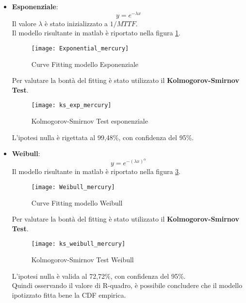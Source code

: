 \begin{itemize}
  \item \textbf{Esponenziale}:
  $$ y = e^{- \lambda  x} $$
  Il valore $\lambda$ è stato inizializzato a $1/MTTF$.\\
  Il modello risultante in matlab è riportato nella figura \ref{Exponential_mercury}.\\

  \begin{figure}[!htbp]
    \centering
    \texttt{[image: Exponential\_mercury]}
    \caption{Curve Fitting modello Esponenziale}
    \label{Exponential_mercury}
  \end{figure}

  Per valutare la bontà del fitting è stato utilizzato il \textbf{Kolmogorov-Smirnov Test}.\\

  \begin{figure}[!htbp]
    \centering
    \texttt{[image: ks\_exp\_mercury]}
    \caption{Kolmogorov-Smirnov Test esponenziale}
    \label{ks_exp_mercury}
  \end{figure}

  L'ipotesi nulla è rigettata al 99,48\%, con confidenza del 95\%.

  \clearpage

  \item \textbf{Weibull}:
  $$ y = e^{- (\lambda x)^\alpha} $$
  Il modello risultante in matlab è riportato nella figura \ref{Weibull_mercury}.\\
  \begin{figure}[!htbp]
    \texttt{[image: Weibull\_mercury]}
    \caption{Curve Fitting modello Weibull}
    \label{Weibull_mercury}
  \end{figure}

  Per valutare la bontà del fitting è stato utilizzato il \textbf{Kolmogorov-Smirnov Test}.\\

  \begin{figure}[!htbp]
    \centering
    \texttt{[image: ks\_weibull\_mercury]}
    \caption{Kolmogorov-Smirnov Test Weibull}
    \label{ks_weibull_mercury}
  \end{figure}

  L'ipotesi nulla è valida al 72,72\%, con confidenza del 95\%.\\
  Quindi osservando il valore di R-quadro, è possibile concludere che il
  modello ipotizzato fitta bene la CDF empirica.\\


\end{itemize}
